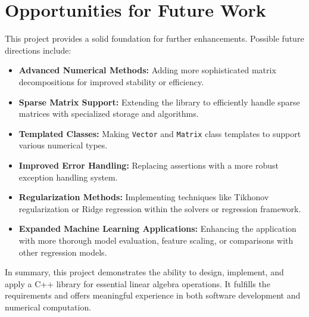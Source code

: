 \section{Opportunities for Future Work}
This project provides a solid foundation for further enhancements. Possible future directions include:
\begin{itemize}
    \item \textbf{Advanced Numerical Methods:} Adding more sophisticated matrix decompositions for improved stability or efficiency.
    \item \textbf{Sparse Matrix Support:} Extending the library to efficiently handle sparse matrices with specialized storage and algorithms.
    \item \textbf{Templated Classes:} Making \texttt{Vector} and \texttt{Matrix} class templates to support various numerical types.
    \item \textbf{Improved Error Handling:} Replacing assertions with a more robust exception handling system.
    \item \textbf{Regularization Methods:} Implementing techniques like Tikhonov regularization or Ridge regression within the solvers or regression framework.
    \item \textbf{Expanded Machine Learning Applications:} Enhancing the application with more thorough model evaluation, feature scaling, or comparisons with other regression models.
\end{itemize}

In summary, this project demonstrates the ability to design, implement, and apply a C++ library for essential linear algebra operations. It fulfills the requirements and offers meaningful experience in both software development and numerical computation.